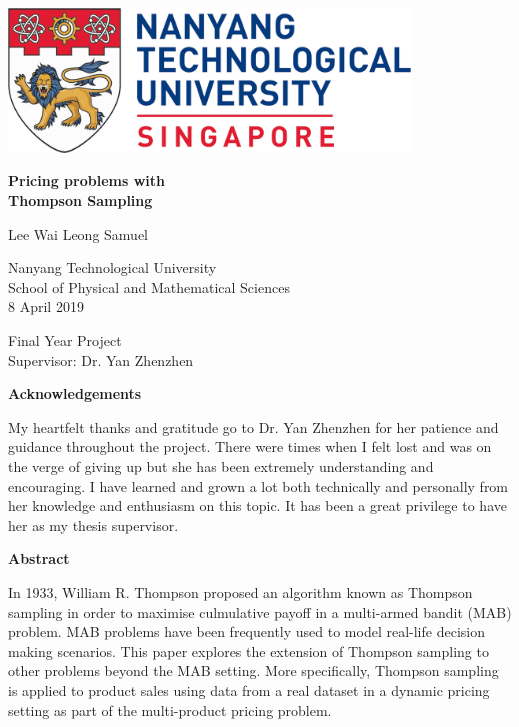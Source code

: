 \documentclass[a4paper]{article}
\begin{document}
\begin{titlepage}
	\begin{center}
		
		\includegraphics[width=0.8\textwidth]{NTU.png}
		\vspace{2cm}
		
		\huge
		
		\textbf{Pricing problems with \\Thompson Sampling}
		
		\vspace{1cm}
		\Large
		Lee Wai Leong Samuel
		
		\vspace{2cm}
		\Large
		Nanyang Technological University\\
		School of Physical and Mathematical Sciences\\
		8 April 2019
		
		\vfill
		
		Final Year Project\\
		Supervisor: Dr. Yan Zhenzhen
		
		\vspace{0.8cm}
		
	\end{center}
\end{titlepage}

\begin{center}
	\large
	\textbf{Acknowledgements}
	\vspace{1cm}
	
	My heartfelt thanks and gratitude go to Dr. Yan Zhenzhen for her patience and guidance throughout the project. There were times when I felt lost and was on the verge of giving up but she has been extremely understanding and encouraging. I have learned and grown a lot both technically and personally from her knowledge and enthusiasm on this topic. It has been a great privilege to have her as my thesis supervisor.
\end{center}
\pagebreak
\begin{center}
	\large
	\textbf{Abstract}
	\vspace{1cm}
	
	
	In 1933, William R. Thompson proposed an algorithm known as Thompson sampling in order to maximise culmulative payoff in a multi-armed bandit (MAB) problem. MAB problems have been frequently used to model real-life decision making scenarios. This paper explores the extension of Thompson sampling to other problems beyond the MAB setting. More specifically, Thompson sampling is applied to product sales using data from a real dataset in a dynamic pricing setting as part of the multi-product pricing problem. 
\end{center}
\pagebreak
\large
\renewcommand{\baselinestretch}{1.5}
\tableofcontents
\end{document}
